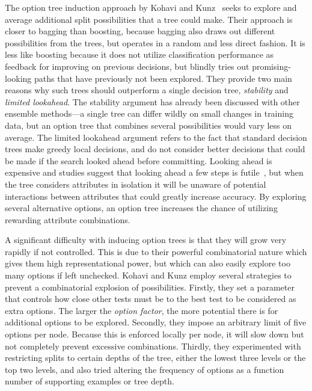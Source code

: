 The option tree induction approach by Kohavi and Kunz~\cite{kohaviot} seeks to explore and average additional split possibilities that a tree could make. Their approach is closer to bagging than boosting, because bagging also draws out different possibilities from the trees, but operates in a random and less direct fashion. It is less like boosting because it does not utilize classification performance as feedback for improving on previous decisions, but blindly tries out promising-looking paths that have previously not been explored. They provide two main reasons why such trees should outperform a single decision tree, {\em stability} and {\em limited lookahead}. The stability argument has already been discussed with other ensemble methods---a single tree can differ wildly on small changes in training data, but an option tree that combines several possibilities would vary less on average. The limited lookahead argument refers to the fact that standard decision trees make greedy local decisions, and do not consider better decisions that could be made if the search looked ahead before committing. Looking ahead is expensive and studies suggest that looking ahead a few steps is futile~\cite{dtlookahead}, but when the tree considers attributes in isolation it will be unaware of potential interactions between attributes that could greatly increase accuracy. By exploring several alternative options, an option tree increases the chance of utilizing rewarding attribute combinations.

A significant difficulty with inducing option trees is that they will grow very rapidly if not controlled. This is due to their powerful combinatorial nature which gives them high representational power, but which can also easily explore too many options if left unchecked. Kohavi and Kunz employ several strategies to prevent a combinatorial explosion of possibilities. Firstly, they set a parameter that controls how close other tests must be to the best test to be considered as extra options. The larger the {\em option factor}, the more potential there is for additional options to be explored. Secondly, they impose an arbitrary limit of five options per node. Because this is enforced locally per node, it will slow down but not completely prevent excessive combinations. Thirdly, they experimented with restricting splits to certain depths of the tree, either the lowest three levels or the top two levels, and also tried altering the frequency of options as a function number of supporting examples or tree depth.

